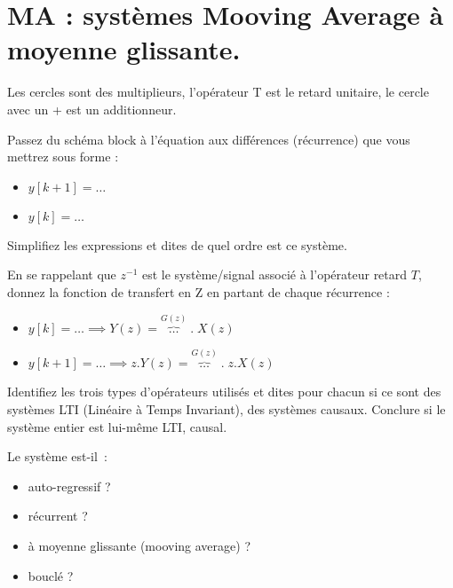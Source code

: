 
 \section{MA : systèmes Mooving Average à moyenne glissante.}



Les cercles sont des multiplieurs, l'opérateur T est le retard unitaire, le cercle avec un + est un additionneur.





Passez du schéma block à l'équation aux différences (récurrence) que vous mettrez sous forme :  
\begin{itemize}
\item $y[k+1]=\ldots$  
\item $y[k]=\ldots$  
\end{itemize}
Simplifiez les expressions et dites de quel ordre est ce système.  




En se rappelant que $z^{-1}$ est le système/signal associé à
l'opérateur retard $T$, donnez la fonction de transfert en Z en
partant de chaque récurrence :
\begin{itemize}
\item $y[k]=\ldots \implies Y(z) = \overbrace{\ldots}^{G(z)} \;.\; X(z) $  
\item $y[k+1]=\ldots \implies z.Y(z) =  \overbrace{\ldots}^{G(z)} \;.\; z.X(z)$
\end{itemize}




Identifiez les trois types d'opérateurs utilisés et dites pour chacun
si ce sont des systèmes LTI (Linéaire à Temps Invariant), des systèmes
causaux.  Conclure si le système entier est lui-même LTI, causal.

Le système est-il~:
\begin{itemize}
\item auto-regressif ?
\item récurrent ?
\item à moyenne glissante (mooving
  average) ?
\item bouclé ?
\end{itemize}





